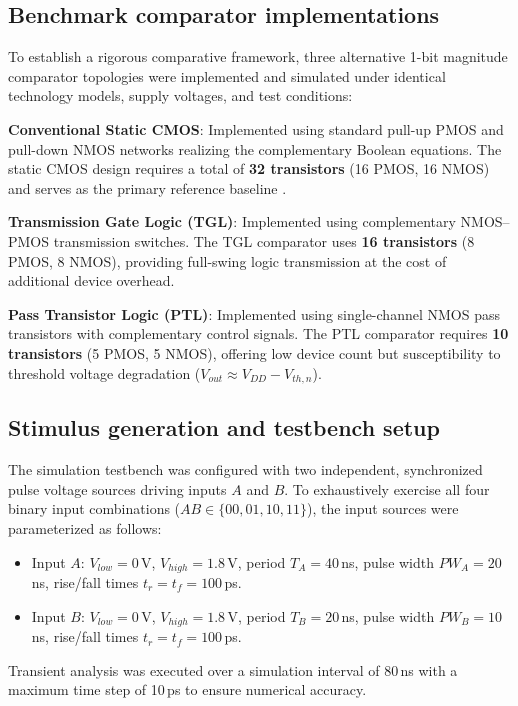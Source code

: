 \documentclass[final,5p,times,twocolumn]{elsarticle}
\begin{document}
\subsection{Benchmark comparator implementations}

To establish a rigorous comparative framework, three alternative 1-bit magnitude comparator topologies were implemented and simulated under identical technology models, supply voltages, and test conditions:

\textbf{Conventional Static CMOS}: Implemented using standard pull-up PMOS and pull-down NMOS networks realizing the complementary Boolean equations. The static CMOS design requires a total of \textbf{32 transistors} (16 PMOS, 16 NMOS) and serves as the primary reference baseline \cite{weste2011}.

\textbf{Transmission Gate Logic (TGL)}: Implemented using complementary NMOS--PMOS transmission switches. The TGL comparator uses \textbf{16 transistors} (8 PMOS, 8 NMOS), providing full-swing logic transmission at the cost of additional device overhead.

\textbf{Pass Transistor Logic (PTL)}: Implemented using single-channel NMOS pass transistors with complementary control signals. The PTL comparator requires \textbf{10 transistors} (5 PMOS, 5 NMOS), offering low device count but susceptibility to threshold voltage degradation ($V_{out} \approx V_{DD} - V_{th,n}$).

\subsection{Stimulus generation and testbench setup}

The simulation testbench was configured with two independent, synchronized pulse voltage sources driving inputs $A$ and $B$. To exhaustively exercise all four binary input combinations ($AB \in \{00, 01, 10, 11\}$), the input sources were parameterized as follows:
\begin{itemize}
    \item Input $A$: $V_{low} = 0$\,V, $V_{high} = 1.8$\,V, period $T_A = 40$\,ns, pulse width $PW_A = 20$\,ns, rise/fall times $t_r = t_f = 100$\,ps.
    \item Input $B$: $V_{low} = 0$\,V, $V_{high} = 1.8$\,V, period $T_B = 20$\,ns, pulse width $PW_B = 10$\,ns, rise/fall times $t_r = t_f = 100$\,ps.
\end{itemize}

Transient analysis was executed over a simulation interval of 80\,ns with a maximum time step of 10\,ps to ensure numerical accuracy.
\end{document}
